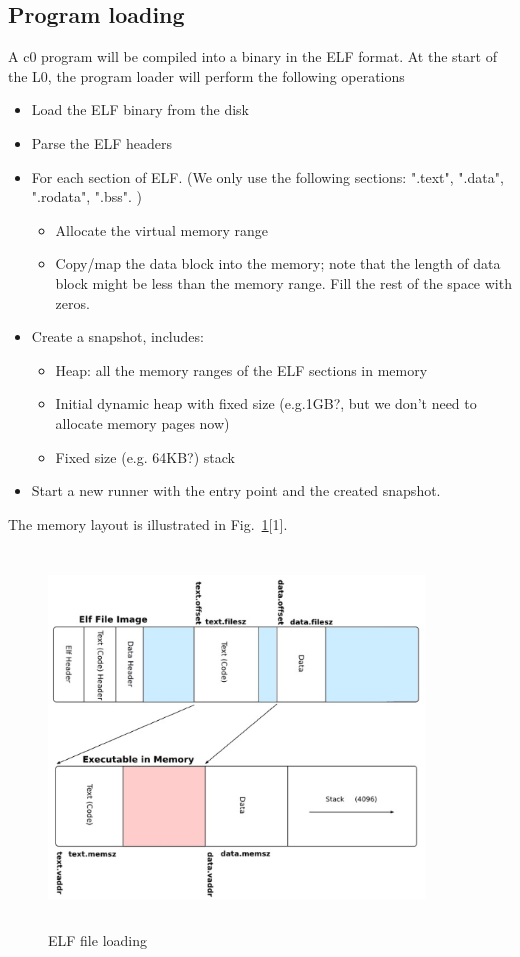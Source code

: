 \documentclass[a4paper]{article}
\begin{document}
{\color{lightblue}\subsection{Program loading}}

A c0 program will be compiled into a binary in the ELF format. 
At the start of the L0, the program loader will perform the following operations

\begin{itemize}
	\item Load the ELF binary from the disk
	\item Parse the ELF headers
	\item For each section of ELF. (We only use the following sections: ".text", ".data", ".rodata", ".bss". )
		\begin{itemize}
			\item Allocate the virtual memory range 
			\item Copy/map the data block into the memory; note that the length of data block might be less than the memory range. Fill the rest of the space with zeros.
		\end{itemize}
	\item Create a snapshot, includes:
		\begin{itemize}
			\item Heap: all the memory ranges of the ELF sections in memory
			\item Initial dynamic heap with fixed size (e.g.1GB?, but we don't need to allocate memory pages now)
			\item Fixed size (e.g. 64KB?) stack
		\end{itemize}
	\item Start a new runner with the entry point and the created snapshot.
\end{itemize}
The memory layout is illustrated in Fig.~\ref{fig:c0-elf}[1].\\
\begin{figure}[htbp]
\begin{center}
  \includegraphics[width=10cm, height=10cm]{figure/elf.eps}
  \caption{ELF file loading}
  \label{fig:c0-elf}
\end{center}
\end{figure}
\end{document}
